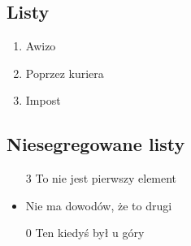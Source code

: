 \subsection{Listy}
\begin{enumerate}
    \item Awizo
    \item Poprzez kuriera
    \item Impost
\end{enumerate}

\subsection{Niesegregowane listy}

\begin{itemize}
    \item[3] To nie jest pierwszy element
    \item Nie ma dowodów, że to drugi
    \item[0] Ten kiedyś był u góry
\end{itemize}


